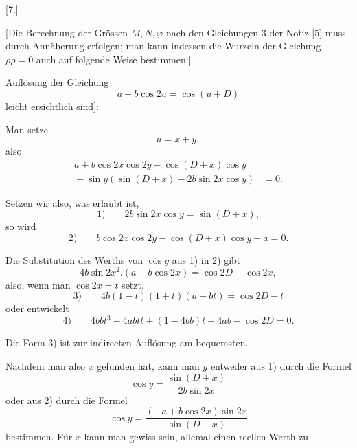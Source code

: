 \clearpage
\begingroup
{}
\renewcommand{\headrulewidth}{0pt}
\par\medskip
{}
\begin{center}[7.]\end{center}
\begingroup
\small
\par\noindent\hspace*{\parindent}[Die Berechnung der Grössen \(M,N,\varphi\) nach den Gleichungen 3 der
Notiz [5] muss durch Annäherung erfolgen; man kann indessen die Wurzeln der
Gleichung \(\rho\rho=0\) auch auf folgende Weise bestimmen:]
\par\noindent\hspace*{\parindent}Auflösung der Gleichung
\[
a+b\cos2u=\cos(u+D)
\]
\noindent[wo \(u\) für \(E'\) geschrieben ist und die Beziehungen der Constanten \(a,b,D\)
zu denen der Gleichung 1 der Notiz [5] leicht ersichtlich sind]:
\par\noindent\hspace*{\parindent}Man setze
\[
u=x+y,
\]
\noindent also
\[
\begin{aligned}
a+b\cos2x\cos2y-\cos(D+x)\cos y&\\
{}+\sin y(\sin(D+x)-2b\sin2x\cos y)&=0.
\end{aligned}
\]
\par\noindent\hspace*{\parindent}Setzen wir also, was erlaubt ist,
\[
\text{1)}\qquad 2b\sin2x\cos y=\sin(D+x),
\]
\noindent so wird
\[
\text{2)}\qquad b\cos2x\cos2y-\cos(D+x)\cos y+a=0.
\]
\par\noindent\hspace*{\parindent}Die Substitution des Werths von \(\cos y\) aus 1) in 2) gibt
\[
4b\sin2x^2\mathord{.}(a-b\cos2x)=\cos2D-\cos2x,
\]
\noindent also, wenn man \(\cos2x=t\) setzt,
\[
\text{3)}\qquad 4b(1-t)(1+t)(a-bt)=\cos2D-t
\]
\noindent oder entwickelt
\[
\text{4)}\qquad 4bbt^3-4abtt+(1-4bb)t+4ab-\cos2D=0.
\]
\par\noindent\hspace*{\parindent}Die Form 3) ist zur indirecten Auflösung am bequemsten.
\par\noindent\hspace*{\parindent}Nachdem man also \(x\) gefunden hat, kann man \(y\) entweder aus 1) durch
die Formel
\[
\cos y=\frac{\sin(D+x)}{2b\sin2x}
\]
\noindent oder aus 2) durch die Formel
\[
\cos y=\frac{(-a+b\cos2x)\sin2x}{\sin(D-x)}
\]
\noindent bestimmen. Für \(x\) kann man gewiss sein, allemal einen reellen Werth zu

